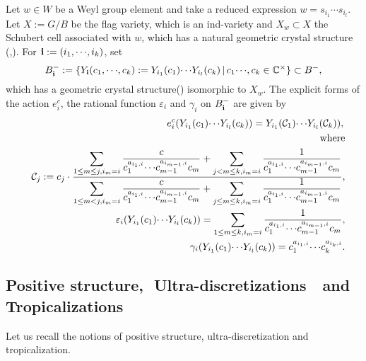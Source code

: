 Let $w\in W$ be a Weyl group element and take a 
reduced expression $w=s_{i_1}{\cdots} s_{i_l}$. 
Let $X:=G/B$ be the flag
variety, which is an ind-variety 
and $X_w\subset X$ the
Schubert cell associated with $w$, which has 
a natural geometric crystal structure
(\cite{BK},\cite{N}).
For ${\bf i}:=(i_1,{\cdots},i_k)$, set 
\begin{equation}
B_{\bf i}^-
:=\{Y_{\bf i}(c_1,{\cdots},c_k)
:=Y_{i_1}(c_1){\cdots} Y_{i_l}(c_k)
\,\vert\, c_1{\cdots},c_k\in{\mathbb C}^\times\}\subset B^-,
\label{bw1}
\end{equation}
which has a geometric crystal structure(\cite{N})
isomorphic to $X_w$. 
The explicit forms of the action $e^c_i$, the rational 
function ${\varepsilon}_i$  and $\gamma_i$ on 
$B_{\bf i}^-$ are given by
\begin{eqnarray}
&& e_i^c(Y_{i_1}(c_1){\cdots} Y_{i_l}(c_k))
=Y_{i_1}({\mathcal C}_1){\cdots} Y_{i_l}({\mathcal C}_k)),{\nonumber} \\
&&\text{where}{\nonumber}\\
&&{\mathcal C}_j:=
c_j\cdot \frac{\displaystyle \sum_{1\leq m\leq j,i_m=i}
 \frac{c}
{c_1^{a_{i_1,i}}{\cdots} c_{m-1}^{a_{i_{m-1},i}}c_m}
+\sum_{j< m\leq k,i_m=i} \frac{1}
{c_1^{a_{i_1,i}}{\cdots} c_{m-1}^{a_{i_{m-1},i}}c_m}}
{\displaystyle\sum_{1\leq m<j,i_m=i} 
 \frac{c}
{c_1^{a_{i_1,i}}{\cdots} c_{m-1}^{a_{i_{m-1},i}}c_m}+
\mathop\sum_{j\leq m\leq k,i_m=i}  \frac{1}
{c_1^{a_{i_1,i}}{\cdots} c_{m-1}^{a_{i_{m-1},i}}c_m}},
\label{eici}\\
&& {\varepsilon}_i(Y_{i_1}(c_1){\cdots} Y_{i_l}(c_k))=
\sum_{1\leq m\leq k,i_m=i} \frac{1}
{c_1^{a_{i_1,i}}{\cdots} c_{m-1}^{a_{i_{m-1},i}}c_m},
\label{vep-i}\\
&&\gamma_i(Y_{i_1}(c_1){\cdots} Y_{i_l}(c_k))
=c_1^{a_{i_1,i}}{\cdots} c_k^{a_{i_k,i}}.
\label{gamma-i}
\end{eqnarray}

\subsection{Positive structure,\,\,
Ultra-discretizations \,\, and \,\,Tropicalizations}
\label{positive-str}
Let us recall the notions of 
positive structure, ultra-discretization and tropicalization.

